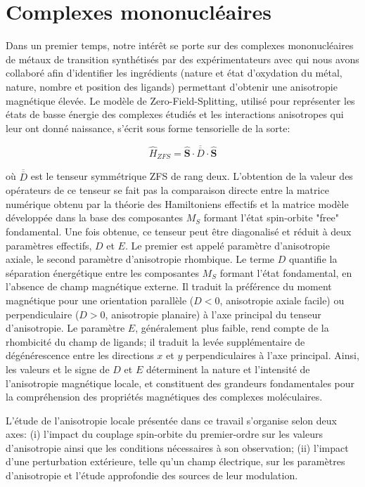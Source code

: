 \documentclass[12pt,a4paper]{report}
\numberwithin{equation}{section}
\begin{document}
\section*{ Complexes mononucléaires}

Dans un premier temps, notre intérêt se porte sur des complexes mononucléaires de métaux de transition synthétisés par des expérimentateurs avec qui nous avons collaboré afin  d'identifier les ingrédients (nature et état d'oxydation du métal, nature, nombre et position des ligands) permettant d'obtenir une anisotropie magnétique élevée.
Le modèle de Zero-Field-Splitting, utilisé pour représenter les états de basse énergie des complexes étudiés et les interactions anisotropes qui leur ont donné naissance, s'écrit sous forme tensorielle de la sorte:

\begin{equation}
  \hat{H}_{ZFS}=\hat{\mathbf{S}} \cdot \overline{\overline{D}} \cdot \hat{\mathbf{S}}
\end{equation}

où $\overline{\overline{D}}$ est le tenseur symmétrique ZFS de rang deux.
L'obtention de la valeur des opérateurs de ce tenseur se fait pas la comparaison directe entre la matrice numérique obtenu par la théorie des Hamiltoniens effectifs et la matrice modèle développée dans la base des composantes $M_S$ formant l'état spin-orbite "free" fondamental. 
Une fois obtenue, ce tenseur peut être diagonalisé et réduit à deux paramètres effectifs, $D$ et $E$.
Le premier est appelé paramètre d'anisotropie axiale, le second paramètre d'anisotropie rhombique.
Le terme \(D\) quantifie la séparation énergétique entre les composantes $M_S$ formant l'état fondamental, en l’absence de champ magnétique externe. Il traduit la préférence du moment magnétique pour une orientation parallèle (\(D < 0\), anisotropie axiale facile) ou perpendiculaire (\(D > 0\), anisotropie planaire) à l’axe principal du tenseur d’anisotropie. 
Le paramètre \(E\), généralement plus faible, rend compte de la rhombicité du champ de ligands; il traduit la levée supplémentaire de dégénérescence entre les directions \(x\) et \(y\) perpendiculaires à l’axe principal. 
Ainsi, les valeurs et le signe de \(D\) et \(E\) déterminent la nature et l’intensité de l’anisotropie magnétique locale, et constituent des grandeurs fondamentales pour la compréhension des propriétés magnétiques des complexes moléculaires.

L'étude de l'anisotropie locale présentée dans ce travail s'organise selon deux axes: (i) l'impact du couplage spin-orbite du premier-ordre sur les valeurs d'anisotropie ainsi que les conditions nécessaires à son observation; (ii) l'impact d'une perturbation extérieure, telle qu'un champ électrique, sur les paramètres d'anisotropie et l'étude approfondie des sources de leur modulation.
\end{document}
